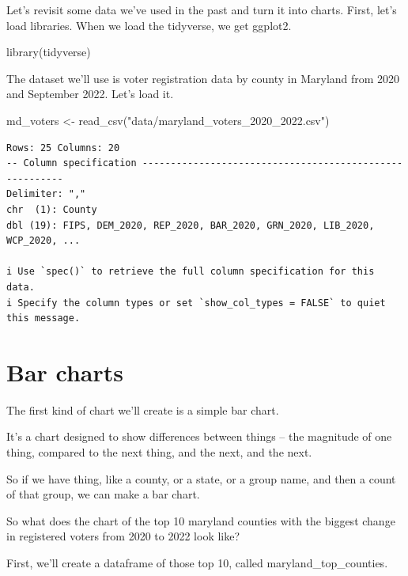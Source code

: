 \documentclass[
  letterpaper,
  DIV=11,
  numbers=noendperiod]{scrreprt}
\newenvironment{Shaded}{\begin{snugshade}}{\end{snugshade}}
\newcommand{\FunctionTok}[1]{\textcolor[rgb]{0.28,0.35,0.67}{#1}}
\newcommand{\NormalTok}[1]{\textcolor[rgb]{0.00,0.23,0.31}{#1}}
\newcommand{\OtherTok}[1]{\textcolor[rgb]{0.00,0.23,0.31}{#1}}
\newcommand{\StringTok}[1]{\textcolor[rgb]{0.13,0.47,0.30}{#1}}
\begin{document}
Let's revisit some data we've used in the past and turn it into charts.
First, let's load libraries. When we load the tidyverse, we get ggplot2.

\begin{Shaded}
\begin{Highlighting}[]
\FunctionTok{library}\NormalTok{(tidyverse)}
\end{Highlighting}
\end{Shaded}

The dataset we'll use is voter registration data by county in Maryland
from 2020 and September 2022. Let's load it.

\begin{Shaded}
\begin{Highlighting}[]
\NormalTok{md\_voters }\OtherTok{\textless{}{-}} \FunctionTok{read\_csv}\NormalTok{(}\StringTok{"data/maryland\_voters\_2020\_2022.csv"}\NormalTok{)}
\end{Highlighting}
\end{Shaded}

\begin{verbatim}
Rows: 25 Columns: 20
-- Column specification --------------------------------------------------------
Delimiter: ","
chr  (1): County
dbl (19): FIPS, DEM_2020, REP_2020, BAR_2020, GRN_2020, LIB_2020, WCP_2020, ...

i Use `spec()` to retrieve the full column specification for this data.
i Specify the column types or set `show_col_types = FALSE` to quiet this message.
\end{verbatim}

\hypertarget{bar-charts}{%
\section{Bar charts}\label{bar-charts}}

The first kind of chart we'll create is a simple bar chart.

It's a chart designed to show differences between things -- the
magnitude of one thing, compared to the next thing, and the next, and
the next.

So if we have thing, like a county, or a state, or a group name, and
then a count of that group, we can make a bar chart.

So what does the chart of the top 10 maryland counties with the biggest
change in registered voters from 2020 to 2022 look like?

First, we'll create a dataframe of those top 10, called
maryland\_top\_counties.
\end{document}
